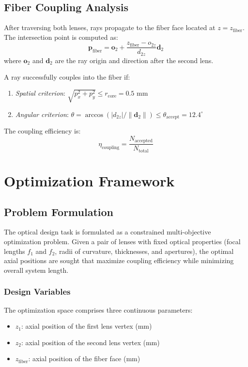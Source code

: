 \subsection{Fiber Coupling Analysis}

After traversing both lenses, rays propagate to the fiber face located at $z = z_{\text{fiber}}$. The intersection point is computed as:
\begin{equation}
\mathbf{p}_{\text{fiber}} = \mathbf{o}_2 + \frac{z_{\text{fiber}} - o_{2z}}{d_{2z}} \mathbf{d}_2
\end{equation}
where $\mathbf{o}_2$ and $\mathbf{d}_2$ are the ray origin and direction after the second lens.

A ray successfully couples into the fiber if:
\begin{enumerate}[leftmargin=*]
    \item \textit{Spatial criterion}: $\sqrt{p_x^2 + p_y^2} \leq r_{\text{core}} = 0.5$ mm
    \item \textit{Angular criterion}: $\theta = \arccos(|d_{2z}|/\|\mathbf{d}_2\|) \leq \theta_{\text{accept}} = 12.4^\circ$
\end{enumerate}
The coupling efficiency is:
\begin{equation}
\eta_{\text{coupling}} = \frac{N_{\text{accepted}}}{N_{\text{total}}}
\end{equation}

\section{Optimization Framework}

\subsection{Problem Formulation}

The optical design task is formulated as a constrained multi-objective optimization problem. Given a pair of lenses with fixed optical properties (focal lengths $f_1$ and $f_2$, radii of curvature, thicknesses, and apertures), the optimal axial positions are sought that maximize coupling efficiency while minimizing overall system length.

\subsubsection{Design Variables}

The optimization space comprises three continuous parameters:
\begin{itemize}[leftmargin=*]
    \item $z_1$: axial position of the first lens vertex (mm)
    \item $z_2$: axial position of the second lens vertex (mm)  
    \item $z_{\text{fiber}}$: axial position of the fiber face (mm)
\end{itemize}

